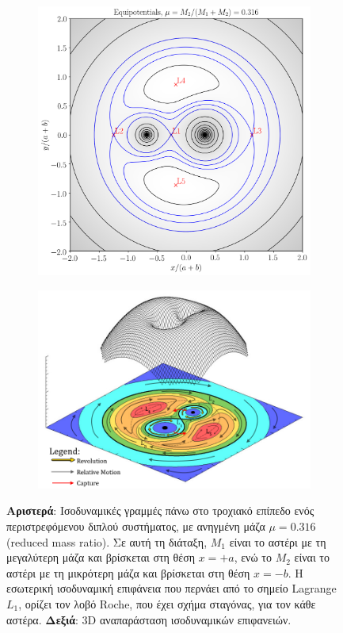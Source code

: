 \begin{figure}[h]
   \centering
\begin{subfigure}[h]{0.45\textwidth}
	\centering
   	 \includegraphics[width = \linewidth]{Figures/equipotentials_mu_0_316.png} 
\end{subfigure}
\begin{subfigure}[h]{0.535\textwidth}
	\centering
	\includegraphics[width = \linewidth]{Figures/RochePotential_-_Colorized.png} 
    \end{subfigure}
    \caption{\textbf{Αριστερά}: Ισοδυναμικές γραμμές πάνω στο τροχιακό επίπεδο ενός περιστρεφόμενου διπλού συστήματος, με ανηγμένη μάζα $\mu = 0.316$ (reduced mass ratio). Σε αυτή τη διάταξη, $M_1$ είναι το αστέρι με τη μεγαλύτερη μάζα και βρίσκεται στη θέση $x = +a$, ενώ το $M_2$ είναι το αστέρι με τη μικρότερη μάζα και βρίσκεται στη θέση $x = -b$. Η εσωτερική ισοδυναμική επιφάνεια που περνάει από το σημείο Lagrange $L_1$, ορίζει τον λοβό Roche, που έχει σχήμα σταγόνας, για τον κάθε αστέρα. \textbf{Δεξιά}: 3D αναπαράσταση ισοδυναμικών επιφανειών.}
    \label{fig:eq_sur}
\end{figure}

